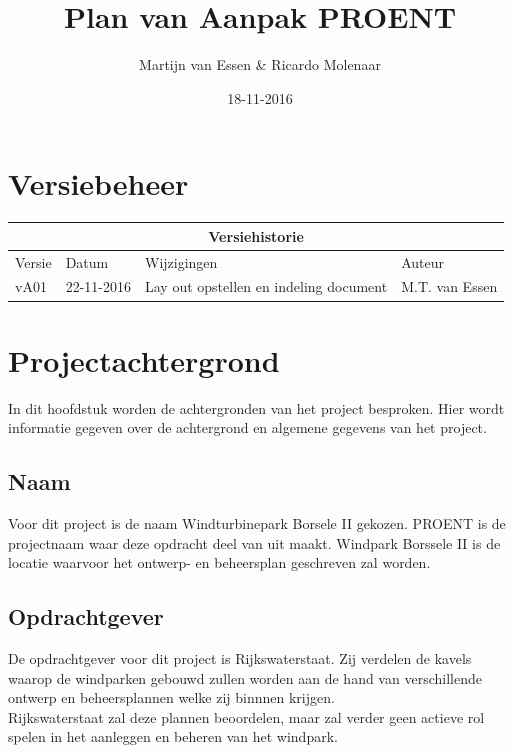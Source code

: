 \documentclass[numbers=endperiod]{scrartcl}
\title{Plan van Aanpak PROENT}
\date{18-11-2016}
\author{Martijn van Essen \& Ricardo Molenaar}
\newcommand{\sectionSmall}[1]{
	\vspace{-10pt}
	\section{#1}
	\vspace{-5pt}
}
\newcommand{\whitespace}{\vspace*{2 mm} \\}%
\begin{document}
	
	\newpage
	
	\setcounter{secnumdepth}{0} %
	\sectionSmall{Versiebeheer}
	
	\begin{center}
		\begin{tabular}{| p{4cm} | l | p{7cm} | l |}
			\hline
			
			\multicolumn{4}{|c|}{
				\cellcolor{hhs_theme_heading_2}
				Versiehistorie
			}  \\ \hline
			
			Versie 	& Datum 		& Wijzigingen 	& Auteur \\ \hline
			vA01 	& 22-11-2016 	& Lay out opstellen en indeling document & M.T. van Essen\\ \hline
		\end{tabular}
	\end{center}
	\newpage
	
	\renewcommand{\contentsname}{Inhoudsopgave} %
	\setcounter{tocdepth}{2}%
	\tableofcontents
	\newpage
	
	\setcounter{secnumdepth}{3}%
	
	\sectionSmall{Projectachtergrond}
	In dit hoofdstuk worden de achtergronden van het project besproken. Hier wordt informatie gegeven over de achtergrond en algemene gegevens van het project.	
	\subsection{Naam}
	Voor dit project is de naam Windturbinepark Borsele II gekozen. PROENT is de projectnaam waar deze opdracht deel van uit maakt. Windpark Borssele II is de locatie waarvoor het ontwerp- en beheersplan geschreven zal worden.
	\subsection{Opdrachtgever}
	De opdrachtgever voor dit project is Rijkswaterstaat. Zij verdelen de kavels waarop de windparken gebouwd zullen worden aan de hand van verschillende ontwerp en beheersplannen welke zij binnnen krijgen.
	\whitespace
	Rijkswaterstaat zal deze plannen beoordelen, maar zal verder geen actieve rol spelen in het aanleggen en beheren van het windpark.
\end{document}
